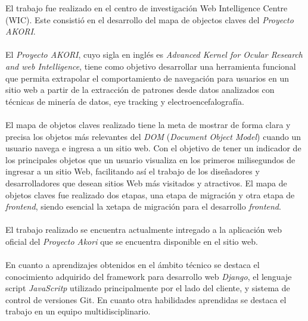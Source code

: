 \documentclass[letterpaper,11pt]{article} %
\begin{document}







\begin{resumen}
	El trabajo fue realizado en el centro de investigación Web Intelligence Centre (WIC). Este consistió en el desarrollo del mapa de objectos claves del \textit{Proyecto AKORI}. \\ \\
	El \textit{Proyecto AKORI}, cuyo sigla en inglés es \textit{Advanced Kernel for Ocular Research and web Intelligence}, tiene como objetivo desarrollar una herramienta funcional que permita extrapolar el comportamiento de navegación para usuarios en un sitio web a partir de la extracción
de patrones desde datos analizados con técnicas de minería de datos, eye tracking y electroencefalografía. \\ \\
	El mapa de objetos claves realizado tiene la meta de mostrar de forma clara y precisa los objetos más relevantes del \textit{DOM} (\textit{Document Object Model}) cuando un usuario navega e ingresa a un sitio web. Con el objetivo de tener un indicador de los principales objetos que un usuario visualiza en los primeros milisegundos de ingresar a un sitio Web, facilitando así el trabajo de los diseñadores y desarrolladores que desean sitios Web más visitados y atractivos. El mapa de objetos claves fue realizado dos etapas, una etapa de migración y otra etapa de \textit{frontend}, siendo esencial la xetapa de migración para el desarrollo \textit{frontend}. \\ \\
	El trabajo realizado se encuentra actualmente intregado a la aplicación web oficial del \textit{Proyecto Akori} que se encuentra disponible en el sitio web. \\ \\
	En cuanto a aprendizajes obtenidos en el ámbito técnico se destaca el conocimiento adquirido del framework para desarrollo web \textit{Django}, el lenguaje script \textit{JavaScritp} utilizado principalmente por el lado del cliente, y sistema de control de versiones Git. En cuanto otra habilidades aprendidas se destaca el trabajo en un equipo multidisciplinario.
\end{resumen}






\end{document}

